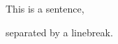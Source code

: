 \documentclass{article}
\begin{document}
\setlength{\parindent}{0cm}
This is a sentence,

separated by a linebreak.
\end{document}

